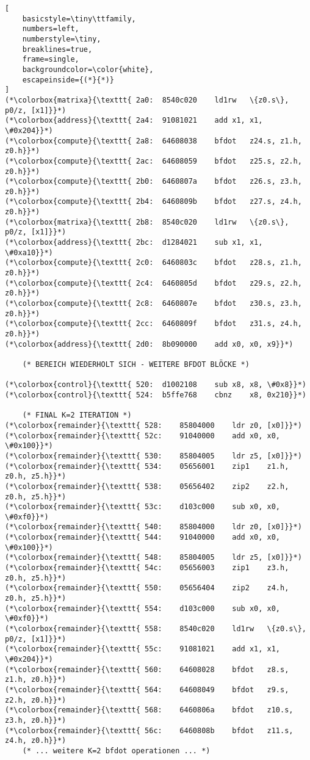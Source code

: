 \documentclass[a4paper,10pt]{article}
\begin{document}
\begin{lstlisting}[
    basicstyle=\tiny\ttfamily,
    numbers=left,
    numberstyle=\tiny,
    breaklines=true,
    frame=single,
    backgroundcolor=\color{white},
    escapeinside={(*}{*)}
]
(*\colorbox{matrixa}{\texttt{ 2a0:	8540c020 	ld1rw	\{z0.s\}, p0/z, [x1]}}*)
(*\colorbox{address}{\texttt{ 2a4:	91081021 	add	x1, x1, \#0x204}}*)
(*\colorbox{compute}{\texttt{ 2a8:	64608038 	bfdot	z24.s, z1.h, z0.h}}*)
(*\colorbox{compute}{\texttt{ 2ac:	64608059 	bfdot	z25.s, z2.h, z0.h}}*)
(*\colorbox{compute}{\texttt{ 2b0:	6460807a 	bfdot	z26.s, z3.h, z0.h}}*)
(*\colorbox{compute}{\texttt{ 2b4:	6460809b 	bfdot	z27.s, z4.h, z0.h}}*)
(*\colorbox{matrixa}{\texttt{ 2b8:	8540c020 	ld1rw	\{z0.s\}, p0/z, [x1]}}*)
(*\colorbox{address}{\texttt{ 2bc:	d1284021 	sub	x1, x1, \#0xa10}}*)
(*\colorbox{compute}{\texttt{ 2c0:	6460803c 	bfdot	z28.s, z1.h, z0.h}}*)
(*\colorbox{compute}{\texttt{ 2c4:	6460805d 	bfdot	z29.s, z2.h, z0.h}}*)
(*\colorbox{compute}{\texttt{ 2c8:	6460807e 	bfdot	z30.s, z3.h, z0.h}}*)
(*\colorbox{compute}{\texttt{ 2cc:	6460809f 	bfdot	z31.s, z4.h, z0.h}}*)
(*\colorbox{address}{\texttt{ 2d0:	8b090000 	add	x0, x0, x9}}*)

    (* BEREICH WIEDERHOLT SICH - WEITERE BFDOT BLÖCKE *)
    
(*\colorbox{control}{\texttt{ 520:	d1002108 	sub	x8, x8, \#0x8}}*)
(*\colorbox{control}{\texttt{ 524:	b5ffe768 	cbnz	x8, 0x210}}*)

    (* FINAL K=2 ITERATION *)
(*\colorbox{remainder}{\texttt{ 528:	85804000 	ldr	z0, [x0]}}*)
(*\colorbox{remainder}{\texttt{ 52c:	91040000 	add	x0, x0, \#0x100}}*)
(*\colorbox{remainder}{\texttt{ 530:	85804005 	ldr	z5, [x0]}}*)
(*\colorbox{remainder}{\texttt{ 534:	05656001 	zip1	z1.h, z0.h, z5.h}}*)
(*\colorbox{remainder}{\texttt{ 538:	05656402 	zip2	z2.h, z0.h, z5.h}}*)
(*\colorbox{remainder}{\texttt{ 53c:	d103c000 	sub	x0, x0, \#0xf0}}*)
(*\colorbox{remainder}{\texttt{ 540:	85804000 	ldr	z0, [x0]}}*)
(*\colorbox{remainder}{\texttt{ 544:	91040000 	add	x0, x0, \#0x100}}*)
(*\colorbox{remainder}{\texttt{ 548:	85804005 	ldr	z5, [x0]}}*)
(*\colorbox{remainder}{\texttt{ 54c:	05656003 	zip1	z3.h, z0.h, z5.h}}*)
(*\colorbox{remainder}{\texttt{ 550:	05656404 	zip2	z4.h, z0.h, z5.h}}*)
(*\colorbox{remainder}{\texttt{ 554:	d103c000 	sub	x0, x0, \#0xf0}}*)
(*\colorbox{remainder}{\texttt{ 558:	8540c020 	ld1rw	\{z0.s\}, p0/z, [x1]}}*)
(*\colorbox{remainder}{\texttt{ 55c:	91081021 	add	x1, x1, \#0x204}}*)
(*\colorbox{remainder}{\texttt{ 560:	64608028 	bfdot	z8.s, z1.h, z0.h}}*)
(*\colorbox{remainder}{\texttt{ 564:	64608049 	bfdot	z9.s, z2.h, z0.h}}*)
(*\colorbox{remainder}{\texttt{ 568:	6460806a 	bfdot	z10.s, z3.h, z0.h}}*)
(*\colorbox{remainder}{\texttt{ 56c:	6460808b 	bfdot	z11.s, z4.h, z0.h}}*)
    (* ... weitere K=2 bfdot operationen ... *)


\end{lstlisting}
\end{document}
